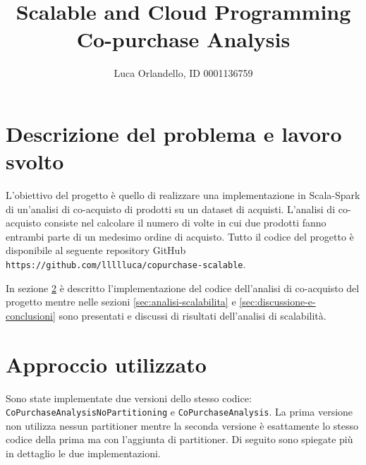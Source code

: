 \documentclass{article}
\title{Scalable and Cloud Programming\\Co-purchase Analysis}
\author{Luca Orlandello, ID 0001136759}
\begin{document}
\maketitle

\section{Descrizione del problema e lavoro svolto}
L’obiettivo del progetto è quello di realizzare una implementazione in Scala-Spark di un'analisi di co-acquisto di prodotti su un dataset di acquisti.
L'analisi di co-acquisto consiste nel calcolare il numero di volte in cui due prodotti fanno entrambi parte di un medesimo ordine di acquisto.
Tutto il codice del progetto è disponibile al seguente repository GitHub\\
\verb|https://github.com/llllluca/copurchase-scalable|.

In sezione \ref{sec:approccio-utilizzato} è descritto l'implementazione del codice dell'analisi di co-acquisto del progetto mentre nelle sezioni \ref{sec:analisi-scalabilita} e \ref{sec:discussione-e-conclusioni} sono presentati e discussi di risultati dell'analisi di scalabilità.

\section{Approccio utilizzato} \label{sec:approccio-utilizzato}
Sono state implementate due versioni dello stesso codice: \verb|CoPurchaseAnalysisNoPartitioning| e \verb|CoPurchaseAnalysis|.
La prima versione non utilizza nessun partitioner mentre la seconda versione è esattamente lo stesso codice della prima ma con l'aggiunta di partitioner.
Di seguito sono spiegate più in dettaglio le due implementazioni.
\end{document}
